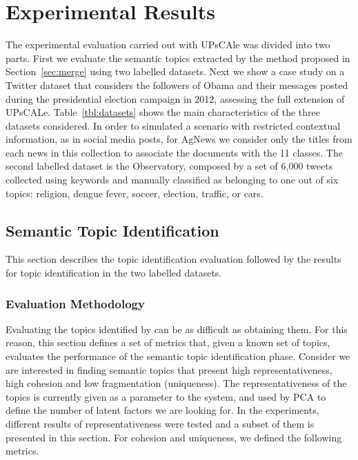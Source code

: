 
\section{Experimental Results}

The experimental evaluation carried out with UPsCAle was divided into two parts. First we evaluate the semantic topics extracted by the method proposed in Section~\ref{sec:merge} using two labelled datasets. Next we show a case study on a Twitter dataset that considers the followers of Obama and their messages posted during the presidential election campaign in 2012, assessing the full extension of UPsCALe. 
Table~\ref{tbl:datasets} shows the main characteristics of the three datasets considered. 
In order to simulated a scenario with restricted contextual information, as in social media posts, for AgNews we consider only the titles from each news in this collection to associate the documents with the 11 classes. 
The second labelled dataset is the Observatory, composed by a set of 6,000 tweets collected using keywords and manually classified as belonging to one out of six topics: religion, dengue fever, soccer, election, traffic, or cars.


\subsection{Semantic Topic Identification}

This section describes the topic identification evaluation followed by the results for topic identification in the two labelled datasets.

\subsubsection{Evaluation Methodology}

Evaluating the topics identified by \method can be as difficult as obtaining them. For this reason, this section defines a set of metrics that, given a known set of topics, evaluates the performance of the semantic topic identification phase. Consider we are 
interested in finding semantic topics that present high representativeness, high cohesion and low 
fragmentation (uniqueness).
The representativeness of the topics is currently given as a parameter to the system, and used by PCA to define the number 
of latent factors we are looking for. In the experiments, different results of representativeness 
were tested and a subset of them is presented in this section. For cohesion and uniqueness, we defined the following metrics.

